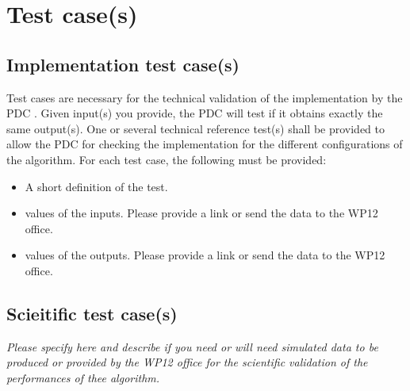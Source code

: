 \documentclass[a4paper, oneside, 11pt, article, english]{memoir}
\begin{document}
\clearpage
\chapter{Test case(s)}
\label{chap:tests}


\section{Implementation test case(s)}
\label{sec:test-implement}


{
  \itshape

  Test cases are necessary for the technical validation of the implementation
  by the PDC . Given input(s) you provide, the PDC will test if it obtains
  exactly the same output(s). One or several technical reference test(s) shall
  be provided to allow the PDC for checking the implementation for the different
  configurations of the algorithm. For each test case, the following must be
  provided:

  \begin{itemize}
    \firmlist
  \item A short definition of the test.
  \item values of the inputs. Please provide a link or send the data to the WP12 office.
  \item values of the outputs. Please provide a link or send the data to the WP12 office.
  \end{itemize}
}


\section{Scieitific test case(s)}
\label{sec:test-science}

\emph{Please specify here and describe if you need or will need simulated data
  to be produced or provided by the WP12 office for the scientific validation of
  the performances of thee algorithm.}
\end{document}
